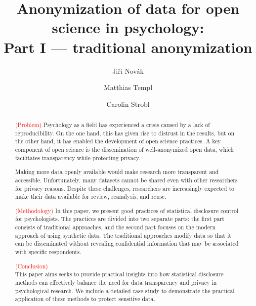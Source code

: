 \documentclass{article}
\title{Anonymization of data for open science in psychology: \\ 
       Part I — traditional anonymization
}
\author{Jiří Novák \and 
        Matthias Templ \and 
        Carolin Strobl
        }
\begin{document}
\maketitle

\begin{abstract}
\textcolor{red}{(Problem)} Psychology as a field has experienced a crisis caused by a lack of reproducibility. 
On the one hand, this has given rise to distrust in the results, but on the other hand, it has enabled the development of open science practices. 
A key component of open science is the dissemination of well-anonymized open data, which facilitates transparency while protecting privacy.

Making more data openly available would make research more transparent and accessible. Unfortunately, many datasets cannot be shared even with other researchers for privacy reasons. 
Despite these challenges, researchers are increasingly expected to make their data available for review, reanalysis, and reuse.

\textcolor{red}{(Methodology)} 
In this paper, we present good practices of statistical disclosure control for psychologists. 
The practices are divided into two separate parts: the first part consists of traditional approaches, and the second part focuses on the modern approach of using synthetic data.
The traditional approaches modify data so that it can be disseminated without revealing confidential information that may be associated with specific respondents. 

\textcolor{red}{(Conclusion)} \\ 
This paper aims seeks to provide practical insights into how statistical disclosure methods can effectively balance the need for data transparency and privacy in psychological research.
We include a detailed case study to demonstrate the practical application of these methods to protect sensitive data.

\end{abstract}

\end{document}
